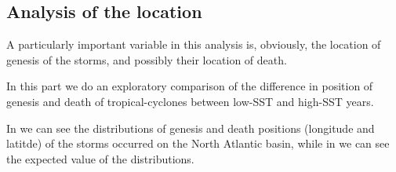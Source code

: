 \subsection{Analysis of the location}
A particularly important variable in this analysis is, obviously, the location of genesis of the storms, and possibly their location of death.

In this part we do an exploratory comparison of the difference in position of genesis and death of tropical-cyclones between low-SST and high-SST years.

\medskip
In  we can see the distributions of genesis and death positions (longitude and latitde) of the storms occurred on the North Atlantic basin, while in  we can see the expected value of the distributions.


